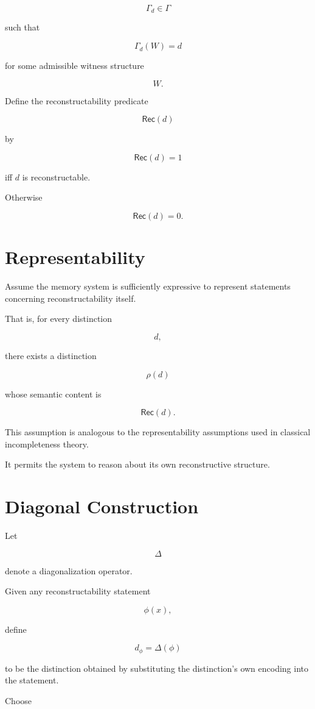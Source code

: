 \documentclass[12pt,oneside]{book}
\theoremstyle{plain} \newtheorem{theorem}{Theorem}[chapter] \newtheorem{lemma}[theorem]{Lemma} \newtheorem{proposition}[theorem]{Proposition} \newtheorem{corollary}[theorem]{Corollary}
\theoremstyle{definition} \newtheorem{definition}[theorem]{Definition} \newtheorem{axiom}[theorem]{Axiom} \newtheorem{construction}[theorem]{Construction}
\theoremstyle{remark} \newtheorem{remark}[theorem]{Remark} \newtheorem{example}[theorem]{Example}
\begin{document}
\[
\Gamma_d
\in
\Gamma
\]

such that

\[
\Gamma_d(W)=d
\]

for some admissible witness structure

\[
W.
\]

Define the reconstructability predicate

\[
\mathsf{Rec}(d)
\]

by

\[
\mathsf{Rec}(d)
=
1
\]

iff $d$ is reconstructable.

Otherwise

\[
\mathsf{Rec}(d)=0.
\]

\section{Representability}

Assume the memory system is sufficiently expressive to represent statements concerning reconstructability itself.

That is, for every distinction

\[
d,
\]

there exists a distinction

\[
\rho(d)
\]

whose semantic content is

\[
\mathsf{Rec}(d).
\]

This assumption is analogous to the representability assumptions used in classical incompleteness theory.

It permits the system to reason about its own reconstructive structure.

\section{Diagonal Construction}

Let

\[
\Delta
\]

denote a diagonalization operator.

Given any reconstructability statement

\[
\phi(x),
\]

define

\[
d_\phi
=
\Delta(\phi)
\]

to be the distinction obtained by substituting the distinction's own encoding into the statement.

Choose
\end{document}
